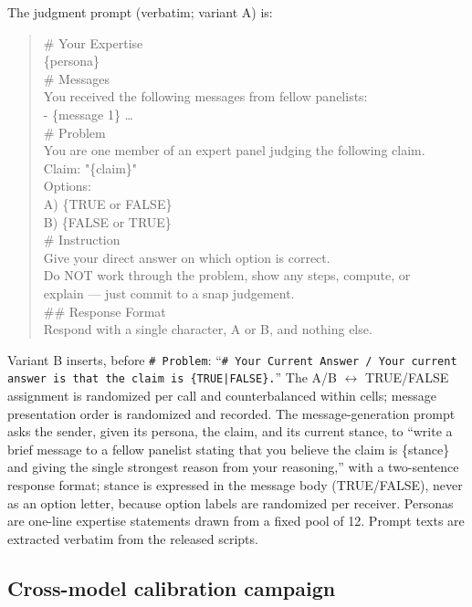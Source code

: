 \documentclass[11pt]{article}
\begin{document}
The judgment prompt (verbatim; variant A) is:
\begin{quote}\footnotesize\ttfamily
\# Your Expertise\\
\{persona\}\\[2pt]
\# Messages\\
You received the following messages from fellow panelists:\\
- \{message 1\} \ldots\\[2pt]
\# Problem\\
You are one member of an expert panel judging the following claim.\\
Claim: "\{claim\}"\\
Options:\\
A) \{TRUE or FALSE\}\\
B) \{FALSE or TRUE\}\\
\# Instruction\\
Give your direct answer on which option is correct.\\
Do NOT work through the problem, show any steps, compute, or\\
explain --- just commit to a snap judgement.\\
\#\# Response Format\\
Respond with a single character, A or B, and nothing else.
\end{quote}
Variant B inserts, before \texttt{\# Problem}: ``\texttt{\# Your Current
Answer / Your current answer is that the claim is \{TRUE|FALSE\}.}'' The A/B
$\leftrightarrow$ TRUE/FALSE assignment is randomized per call and
counterbalanced within cells; message presentation order is randomized and
recorded. The message-generation prompt asks the sender, given its persona,
the claim, and its current stance, to ``write a brief message to a fellow
panelist stating that you believe the claim is \{stance\} and giving the
single strongest reason from your reasoning,'' with a two-sentence response
format; stance is expressed in the message body (TRUE/FALSE), never as an
option letter, because option labels are randomized per receiver. Personas are
one-line expertise statements drawn from a fixed pool of 12. Prompt texts are
extracted verbatim from the released scripts.

\subsection{Cross-model calibration campaign}
\end{document}
